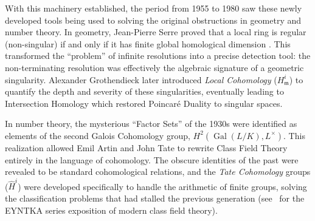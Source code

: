 \documentclass{article}
\begin{document}
With this machinery established, the period from 1955 to 1980 saw these newly developed tools being used to
solving the original obstructions in geometry and number theory. In geometry, Jean-Pierre Serre proved that a
local ring is regular (non-singular) if and only if it has finite global homological dimension
. This transformed the ``problem'' of infinite resolutions into a precise
detection tool: the non-terminating resolution was effectively the algebraic signature of a geometric
singularity. Alexander Grothendieck later introduced \emph{Local Cohomology} ($H^i_{\mathfrak{m}}$) to
quantify the depth and severity of these singularities, eventually leading to Intersection Homology which
restored Poincar\'e Duality to singular spaces.

In number theory, the mysterious ``Factor Sets'' of the 1930s were identified as elements of the second Galois
Cohomology group, $H^2(\operatorname{Gal}(L/K), L^\times)$. This realization allowed Emil Artin and John Tate
to rewrite Class Field Theory entirely in the language of cohomology. The obscure identities of the past were
revealed to be standard cohomological relations, and the \emph{Tate Cohomology} groups ($\hat{H}^i$) were
developed specifically to handle the arithmetic of finite groups, solving the classification problems that had
stalled the previous generation (see~\cite{NateCFT} for the EYNTKA series exposition of modern class field
theory).



\newpage
\printbibliography
\end{document}

